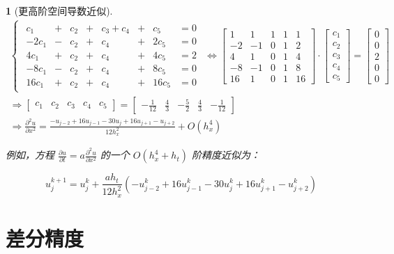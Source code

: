 \documentclass[zihao=5,UTF8]{report}
\theoremstyle{MyTheoremStyle} %
\theoremstyle{MySubsubsectionStyle} %
\newtheorem{definition}{}
\begin{document}
\begin{definition}[更高阶空间导数近似]
\begin{gather}
    \begin{cases}
    \begin{aligned}
        c_1&+&c_2&+&c_3+c_4&+&c_5&=0\\
        -2c_1&-&c_2&+&c_4&+&2c_5&=0\\
        4c_1&+&c_2&+&c_4&+&4c_5&=2\\
        -8c_1&-&c_2&+&c_4&+&8c_5&=0\\
        16c_1&+&c_2&+&c_4&+&16c_5&=0
    \end{aligned}
    \end{cases} \Longleftrightarrow 
    \begin{bmatrix}
        1&  1& 1& 1& 1 \\
       -2& -1& 0& 1& 2 \\ 
        4&  1& 0& 1& 4 \\ 
       -8& -1& 0& 1& 8 \\ 
       16&  1& 0& 1& 16
    \end{bmatrix} \cdot 
    \begin{bmatrix}
        c_1 \\ c_2 \\ c_3 \\ c_4 \\ c_5
    \end{bmatrix} = 
    \begin{bmatrix}
        0 \\ 0 \\ 2 \\ 0 \\ 0
    \end{bmatrix} \\ 
    \Longrightarrow 
    \begin{bmatrix}
        c_1 & c_2 & c_3 & c_4 & c_5
    \end{bmatrix} = 
    \begin{bmatrix}
        -\frac{1}{12} & \frac{4}{3} & -\frac{5}{2} & \frac{4}{3} & - \frac{1}{12}
    \end{bmatrix} \\ 
    \Longrightarrow 
    \frac{\partial^2u}{\partial x^2}=\frac{-u_{j-2}+16u_{j-1}-30u_j+16u_{j+1}-u_{j+2}}{12h_x^2}+O(h_x^4)
\end{gather}

{\par\color{gray}\small
例如，方程 $\frac{\partial u}{\partial t}=a\frac{\partial^2u}{\partial x^2}$ 的一个 $O(h_x^4 + h_t)$ 阶精度近似为：

\begin{equation}
    u_j^{k+1}=u_j^k+\frac{ah_t}{12h_x^2}(-u_{j-2}^k+16u_{j-1}^k-30u_j^k+16u_{j+1}^k-u_{j+2}^k)
\end{equation}

\par}
\end{definition}

\section{差分精度}
\end{document}
